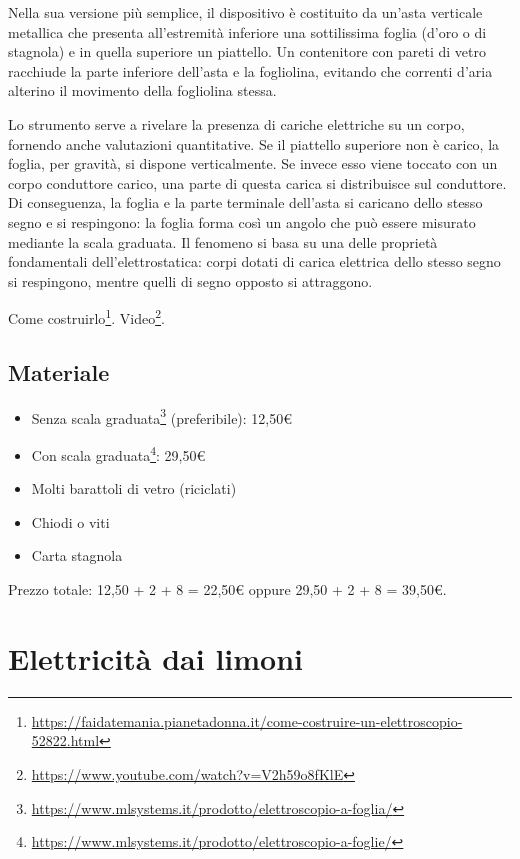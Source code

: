 \documentclass[a4paper]{article}
\begin{document}
Nella sua versione più semplice, il dispositivo è costituito da un'asta
verticale metallica che presenta all'estremità inferiore una sottilissima foglia
(d'oro o di stagnola) e in quella superiore un piattello. Un contenitore con
pareti di vetro racchiude la parte inferiore dell'asta e la fogliolina, evitando
che correnti d'aria alterino il movimento della fogliolina stessa.

Lo strumento serve a rivelare la presenza di cariche elettriche su un corpo,
fornendo anche valutazioni quantitative. Se il piattello superiore non è carico,
la foglia, per gravità, si dispone verticalmente. Se invece esso viene toccato
con un corpo conduttore carico, una parte di questa carica si distribuisce sul
conduttore. Di conseguenza, la foglia e la parte terminale dell'asta si caricano
dello stesso segno e si respingono: la foglia forma così un angolo che può
essere misurato mediante la scala graduata. Il fenomeno si basa su una delle
proprietà fondamentali dell'elettrostatica: corpi dotati di carica elettrica
dello stesso segno si respingono, mentre quelli di segno opposto si attraggono.

Come costruirlo\footnote{
  \url{https://faidatemania.pianetadonna.it/come-costruire-un-elettroscopio-52822.html}
}. Video\footnote{ \url{https://www.youtube.com/watch?v=V2h59o8fKlE} }.

\subsection{Materiale}%
\label{subsec:elettroscopio-materiale}

\begin{itemize}
  \item Senza scala graduata\footnote{
        \url{https://www.mlsystems.it/prodotto/elettroscopio-a-foglia/} }
        (preferibile): 12,50€
  \item Con scala graduata\footnote{
        \url{https://www.mlsystems.it/prodotto/elettroscopio-a-foglie/} }:
        29,50€
  \item Molti barattoli di vetro (riciclati)
  \item Chiodi o viti
  \item Carta stagnola
\end{itemize}

Prezzo totale: 12,50 + 2 + 8 = 22,50€ oppure 29,50 + 2 + 8 = 39,50€.

\section{Elettricità dai limoni}%
\label{sec:limoni}
\end{document}
